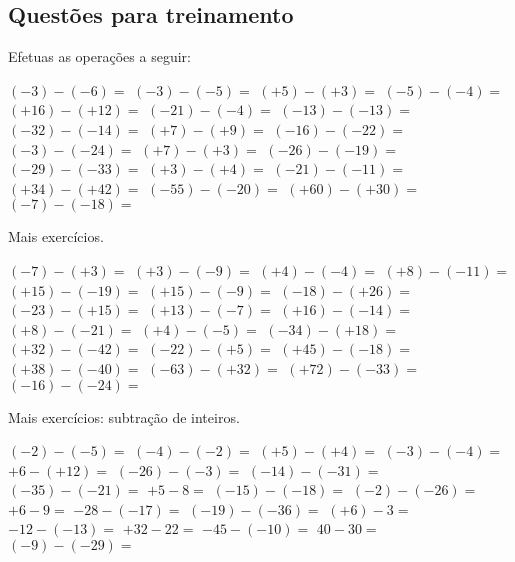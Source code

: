 \begin{questions}


\section{Questões para treinamento}

\question Efetuas as operações a seguir:
	\begin{choices}

		\choice $(-3)-(-6)=$
		\choice $(-3)-(-5)=$
		\choice $(+5)-(+3)=$
		\choice $(-5)-(-4)=$
		\choice $(+16)-(+12)=$
		\choice $(-21)-(-4)=$
		\choice $(-13)-(-13)=$
		\choice $(-32)-(-14)=$
		\choice $(+7)-(+9)=$
		\choice $(-16)-(-22)=$
		\choice $(-3)-(-24)=$
		\choice $(+7)-(+3)=$
		\choice $(-26)-(-19)=$
		\choice $(-29)-(-33)=$
		\choice $(+3)-(+4)=$
		\choice $(-21)-(-11)=$
		\choice $(+34)-(+42)=$
		\choice $(-55)-(-20)=$
		\choice $(+60)-(+30)=$
		\choice $(-7)-(-18)=$

	\end{choices}

	\question Mais exercícios.

\begin{choices}
	
	\choice $(-7)-(+3)=$
	\choice $(+3)-(-9)=$
	\choice $(+4)-(-4)=$
	\choice $(+8)-(-11)=$
	\choice $(+15)-(-19)=$
	\choice $(+15)-(-9)=$
	\choice $(-18)-(+26)=$
	\choice $(-23)-(+15)=$
	\choice $(+13)-(-7)=$
	\choice $(+16)-(-14)=$
	\choice $(+8)-(-21)=$
	\choice $(+4)-(-5)=$
	\choice $(-34)-(+18)=$
	\choice $(+32)-(-42)=$
	\choice $(-22)-(+5)=$
	\choice $(+45)-(-18)=$
	\choice $(+38)-(-40)=$
	\choice $(-63)-(+32)=$
	\choice $(+72)-(-33)=$
	\choice $(-16)-(-24)=$
	
\end{choices}

\question Mais exercícios: subtração de inteiros.

\begin{choices}
	
	\choice $(-2)-(-5)=$
	\choice $(-4)-(-2)=$
	\choice $(+5)-(+4)=$
	\choice $(-3)-(-4)=$
	\choice $+6 - (+12)=$
	\choice $(-26)-(-3)=$
	\choice $(-14)-(-31)=$
	\choice $(-35)-(-21)=$
	\choice $+5 - 8=$
	\choice $(-15)-(-18)=$
	\choice $(-2)-(-26)=$
	\choice $+6 - 9=$
	\choice $-28 - (-17)=$
	\choice $(-19) - (-36)=$
	\choice $(+6) - 3=$
	\choice $-12 - (-13)=$
	\choice $+32 - 22=$
	\choice $-45 - (-10)=$
	\choice $40 - 30=$
	\choice $(-9) - (-29)=$
	

\end{choices}
\end{questions}
